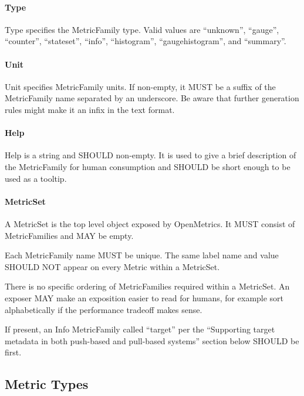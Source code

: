 \documentclass[a4paper,12pt,notitlepage,twoside,openright]{article}
\begin{document}
\hypertarget{type}{%
\paragraph{Type}\label{type}}

Type specifies the MetricFamily type. Valid values are ``unknown'',
``gauge'', ``counter'', ``stateset'', ``info'', ``histogram'',
``gaugehistogram'', and ``summary''.

\hypertarget{unit}{%
\paragraph{Unit}\label{unit}}

Unit specifies MetricFamily units. If non-empty, it MUST be a suffix of
the MetricFamily name separated by an underscore. Be aware that further
generation rules might make it an infix in the text format.

\hypertarget{help}{%
\paragraph{Help}\label{help}}

Help is a string and SHOULD non-empty. It is used to give a brief
description of the MetricFamily for human consumption and SHOULD be
short enough to be used as a tooltip.

\hypertarget{metricset}{%
\paragraph{MetricSet}\label{metricset}}

A MetricSet is the top level object exposed by OpenMetrics. It MUST
consist of MetricFamilies and MAY be empty.

Each MetricFamily name MUST be unique. The same label name and value
SHOULD NOT appear on every Metric within a MetricSet.

There is no specific ordering of MetricFamilies required within a
MetricSet. An exposer MAY make an exposition easier to read for humans,
for example sort alphabetically if the performance tradeoff makes sense.

If present, an Info MetricFamily called ``target'' per the ``Supporting
target metadata in both push-based and pull-based systems'' section
below SHOULD be first.

\hypertarget{metric-types}{%
\subsection{Metric Types}\label{metric-types}}
\end{document}
